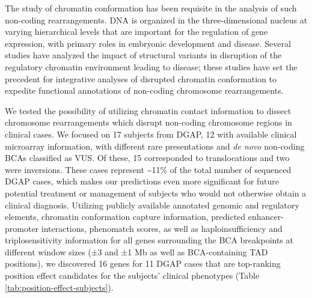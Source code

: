 \documentclass[a4paper,twoside=true,openright,parskip=full,chapterprefix=true,11pt,headings=normal,bibliography=totoc,listof=totoc,titlepage=on,captions=tableabove,draft=false]{scrreprt}
\theoremstyle{definition}
\theoremstyle{definition}
\theoremstyle{definition}
\theoremstyle{remark}
\begin{document}
The study of chromatin conformation has been requisite in the analysis
of such non-coding rearrangements. DNA is organized in the
three-dimensional nucleus at varying hierarchical levels that are
important for the regulation of gene expression,\citep{DeWit2012} with
primary roles in embryonic development and disease.\citep{Bonev2016}
Several studies have analyzed the impact of structural variants in
disruption of the regulatory chromatin environment leading to
disease;\citep{Lupianez2015, Groschel2014, Visser2012, Roussos2014, Giorgio2015, Ibn-Salem2014}
these studies have set the precedent for integrative analyses of
disrupted chromatin conformation to expedite functional annotations of
non-coding chromosome rearrangements.

We tested the possibility of utilizing chromatin contact information to
dissect chromosome rearrangements which disrupt non-coding chromosome
regions in clinical cases. We focused on 17 subjects from DGAP, 12 with
available clinical microarray information, with different rare
presentations and \emph{de novo} non-coding BCAs classified as VUS. Of
these, 15 corresponded to translocations and two were inversions. These
cases represent \textasciitilde{}11\% of the total number of sequenced
DGAP cases, which makes our predictions even more significant for future
potential treatment or management of subjects who would not otherwise
obtain a clinical diagnosis. Utilizing publicly available annotated
genomic and regulatory elements, chromatin conformation capture
information, predicted enhancer-promoter interactions, phenomatch
scores, as well as haploinsufficiency and triplosensitivity information
for all genes surrounding the BCA breakpoints at different window sizes
(±3 and ±1 Mb as well as BCA-containing TAD positions), we discovered 16
genes for 11 DGAP cases that are top-ranking position effect candidates
for the subjects' clinical phenotypes (Table
\ref{tab:position-effect-subjects}).
\end{document}
